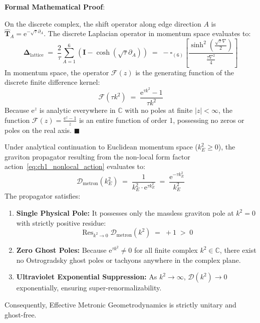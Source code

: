 \documentclass[
    12pt,
    a4paper,
    headings=normal,
    twoside=false,
    open=any,
    parskip=half
]{scrbook}
\newcommand{\eu}{\mathrm{e}}
\newenvironment{myproof}[1][]{%
  \par\vspace{6pt}\noindent\textbf{\sffamily\color{maincolor}Formal Mathematical Proof\ifstrempty{#1}{}{ (#1)}}:\par\nopagebreak
}{%
  \penalty50\hfill\ensuremath{\blacksquare}\par\vspace{6pt}
}
\begin{document}
\begin{myproof}
On the discrete complex, the shift operator along edge direction $A$ is $\hat{\mathbf{T}}_A = \eu^{-\sqrt{\tau}\partial_A}$. The discrete Laplacian operator in momentum space evaluates to:
\begin{equation*}
\boldsymbol{\Delta}_{\text{lattice}} \;=\; \frac{2}{\tau}\sum_{A=1}^6 \left( \mathbf{I} - \cosh(\sqrt{\tau}\partial_A) \right) \;=\; -\square_{(6)} \left[ \frac{\sinh^2\left(\frac{\sqrt{\tau}\nabla}{2}\right)}{\frac{\tau\nabla^2}{4}} \right]
\end{equation*}
In momentum space, the operator $\mathcal{F}(z)$ is the generating function of the discrete finite difference kernel:
\begin{equation*}
\mathcal{F}\left( \tau k^2 \right) \;=\; \frac{\eu^{\tau k^2} - 1}{\tau k^2}
\end{equation*}
Because $\eu^z$ is analytic everywhere in $\mathbb{C}$ with no poles at finite $|z| < \infty$, the function $\mathcal{F}(z) = \frac{\eu^z - 1}{z}$ is an entire function of order 1, possessing no zeros or poles on the real axis.
\end{myproof}

\begin{phystheorem}\label{thm:ch1_ghost_free_propagator_master}
Under analytical continuation to Euclidean momentum space ($k_E^2 \ge 0$), the graviton propagator resulting from the non-local form factor action~\eqref{eq:ch1_nonlocal_action} evaluates to:
\begin{equation}
\boxed{\mathcal{D}_{\text{metron}}(k_E^2) \;=\; \frac{1}{k_E^2 \cdot \eu^{\tau k_E^2}} \;=\; \frac{\eu^{-\tau k_E^2}}{k_E^2}}
\label{eq:ch1_ghost_free_propagator_master}
\end{equation}
The propagator satisfies:
\begin{enumerate}[label=(\alph*), noitemsep]
    \item \textbf{Single Physical Pole:} It possesses only the massless graviton pole at $k^2 = 0$ with strictly positive residue:
    \begin{equation}
    \operatorname{Res}_{k^2 \to 0} \mathcal{D}_{\text{metron}}(k^2) \;=\; +1 \;>\; 0
    \end{equation}
    \item \textbf{Zero Ghost Poles:} Because $\eu^{\tau k^2} \ne 0$ for all finite complex $k^2 \in \mathbb{C}$, there exist no Ostrogradsky ghost poles or tachyons anywhere in the complex plane.
    \item \textbf{Ultraviolet Exponential Suppression:} As $k^2 \to \infty$, $\mathcal{D}(k^2) \to 0$ exponentially, ensuring super-renormalizability.
\end{enumerate}
Consequently, Effective Metronic Geometrodynamics is strictly unitary and ghost-free.
\end{phystheorem}
\end{document}
